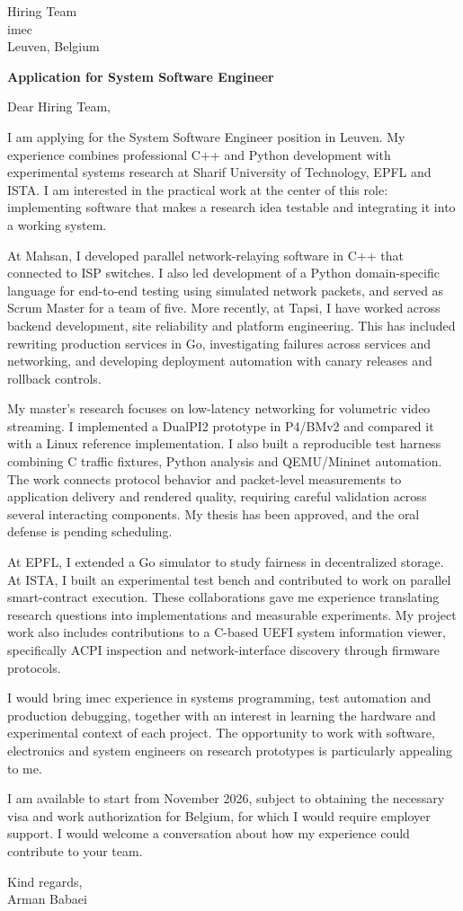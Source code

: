 \documentclass[11pt]{resume}
\begin{document}
\vspace{1em}
Hiring Team\\
imec\\
Leuven, Belgium

\textbf{Application for System Software Engineer}

Dear Hiring Team,

I am applying for the System Software Engineer position in Leuven. My experience combines professional C++ and Python development with experimental systems research at Sharif University of Technology, EPFL and ISTA. I am interested in the practical work at the center of this role: implementing software that makes a research idea testable and integrating it into a working system.

At Mahsan, I developed parallel network-relaying software in C++ that connected to ISP switches. I also led development of a Python domain-specific language for end-to-end testing using simulated network packets, and served as Scrum Master for a team of five. More recently, at Tapsi, I have worked across backend development, site reliability and platform engineering. This has included rewriting production services in Go, investigating failures across services and networking, and developing deployment automation with canary releases and rollback controls.

My master's research focuses on low-latency networking for volumetric video streaming. I implemented a DualPI2 prototype in P4/BMv2 and compared it with a Linux reference implementation. I also built a reproducible test harness combining C traffic fixtures, Python analysis and QEMU/Mininet automation. The work connects protocol behavior and packet-level measurements to application delivery and rendered quality, requiring careful validation across several interacting components. My thesis has been approved, and the oral defense is pending scheduling.

At EPFL, I extended a Go simulator to study fairness in decentralized storage. At ISTA, I built an experimental test bench and contributed to work on parallel smart-contract execution. These collaborations gave me experience translating research questions into implementations and measurable experiments. My project work also includes contributions to a C-based UEFI system information viewer, specifically ACPI inspection and network-interface discovery through firmware protocols.

I would bring imec experience in systems programming, test automation and production debugging, together with an interest in learning the hardware and experimental context of each project. The opportunity to work with software, electronics and system engineers on research prototypes is particularly appealing to me.

I am available to start from November 2026, subject to obtaining the necessary visa and work authorization for Belgium, for which I would require employer support. I would welcome a conversation about how my experience could contribute to your team.

Kind regards,\\[0.4em]
Arman Babaei
\end{document}
